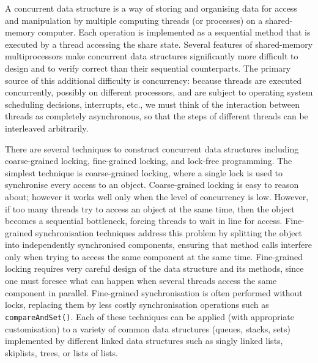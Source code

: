 A concurrent data structure is a way of storing and organising data for access and manipulation by multiple computing threads (or processes) on a shared-memory computer. Each operation is implemented as a sequential
method that is executed by a thread accessing the share state. Several features of shared-memory multiprocessors make concurrent data structures significantly more difficult to design and to verify correct than their sequential counterparts. The primary source of this additional difficulty is concurrency: because threads are executed concurrently, possibly on different processors, and are subject to operating system scheduling decisions, interrupts, etc., we must think of the interaction between threads as completely asynchronous, so that the steps of different threads can be interleaved arbitrarily. %



There are several techniques to construct concurrent data structures including coarse-grained locking, fine-grained locking, and lock-free programming. The simplest technique is coarse-grained locking, where a single lock is used to synchronise every access to an object. Coarse-grained locking is easy to reason about; however it works well only when the level of concurrency is low. However, if too many threads try to access an object at the same time, then the object becomes a sequential bottleneck, forcing threads to wait in line for access. Fine-grained synchronisation techniques address this problem by splitting the object into independently synchronised components, ensuring that method calls interfere only when trying to access the same component at the same time. Fine-grained locking requires very careful design of the data structure and its
methods, since one must foresee what can happen when several threads access
the same component in parallel.
Fine-grained synchronisation is often performed without locks, replacing them by less costly
synchronisation operations such as {\tt compareAndSet()}. Each of these techniques can be applied (with appropriate customisation) to a variety of common data structures (queues, stacks, sets) implemented by different linked data structures such as singly linked lists, skiplists, trees, or lists of lists. 


\vspace{1cm}





